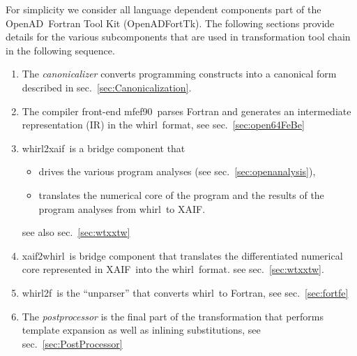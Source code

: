 \documentclass{book}
\newcommand{\mfefninety}{mfef90}
\newcommand{\OpenAD}{OpenAD}
\newcommand{\OpenADFortTk}{OpenADFortTk}
\newcommand{\xaif}{XAIF}
\newcommand{\whirl}{whirl}
\newcommand{\whirlToxaif}{whirl2xaif}
\newcommand{\whirlTof}{whirl2f}
\newcommand{\xaifTowhirl}{xaif2whirl}
\newcommand{\refsec}[1]{{sec.~\ref{#1}}}
\begin{document}
For simplicity we consider all language dependent components part 
of the \OpenAD\ Fortran Tool Kit (\OpenADFortTk). The following 
sections provide details for the various subcomponents that 
are used in transformation tool chain in the following sequence.
\begin{enumerate}	
\item The {\em canonicalizer} converts  
  programming constructs into a canonical form described in \refsec{sec:Canonicalization}. 

\item The compiler front-end \mfefninety\  parses
  Fortran and generates an intermediate representation (IR)
  in the \whirl\ format, see \refsec{sec:open64FeBe}

\item \whirlToxaif\ is a bridge component that
  \begin{itemize}
  \item drives the various program analyses (see \refsec{sec:openanalysis}),
  \item translates the numerical core of the program and  
    the results of the program analyses from \whirl\ to \xaif.
  \end{itemize} see also \refsec{sec:wtxxtw}

\item \xaifTowhirl\ is bridge component that translates the 
  differentiated numerical core represented in \xaif\ 
  into the \whirl\ format. see \refsec{sec:wtxxtw}.

\item \whirlTof\ is the ``unparser'' that converts \whirl\ to
  Fortran, see \refsec{sec:fortfe}

\item The {\em postprocessor} is the  final part of the transformation that
  performs template expansion as well as inlining substitutions, see \refsec{sec:PostProcessor}

\end{enumerate}

\end{document}
